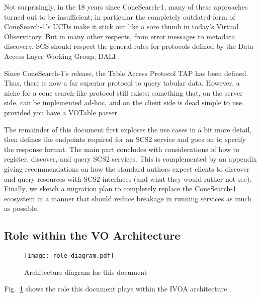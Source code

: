 \documentclass[11pt,a4paper]{ivoa}
\begin{document}
Not surprisingly, in the 18 years since ConeSearch-1, many of these approaches
turned out to be insufficient; in particular the completely outdated
form of ConeSearch-1's UCDs make it stick out like a sore thumb in today's
Virtual Observatory.  But in many other respects, from error messages to
metadata discovery, SCS should respect the general
rules for protocols defined by the Data Access Layer Working Group, DALI
\citep{2017ivoa.spec.0517D}.

Since ConeSearch-1's release, the Table Access Protocol TAP
\citep{2019ivoa.spec.0927D} has been defined.  Thus, there is now a far
superior protocol to query tabular data.  However, a niche for a cone
search-like protocol still exists: something that, on the server side,
can be implemented ad-hoc, and on the client side is dead simple to use
provided you have a VOTable parser.

The remainder of this document first explores the use cases in a bit
more detail, then defines the endpoints required for an SCS2 service and
goes on to specify the response format.  The main part
concludes with considerations
of how to register, discover, and query SCS2 services.
This is complemented by an appendix giving recommendations on how the
standard authors expect clients to discover and query resources with
SCS2 interfaces (and what they would rather not see).  Finally, we
sketch a migration plan to completely replace the ConeSearch-1 ecosystem
in a manner that should reduce breakage in running services as much as
possible.

\subsection{Role within the VO Architecture}

\begin{figure}
\centering


\texttt{[image: role\_diagram.pdf]}
\caption{Architecture diagram for this document}
\label{fig:archdiag}
\end{figure}

Fig.~\ref{fig:archdiag} shows the role this document plays within the
IVOA architecture \citep{2021ivoa.spec.1101D}.
\end{document}

